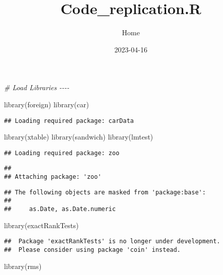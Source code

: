 \documentclass[
]{article}
\title{Code\_replication.R}
\author{Home}
\date{2023-04-16}
\newenvironment{Shaded}{\begin{snugshade}}{\end{snugshade}}
\newcommand{\CommentTok}[1]{\textcolor[rgb]{0.56,0.35,0.01}{\textit{#1}}}
\newcommand{\FunctionTok}[1]{\textcolor[rgb]{0.00,0.00,0.00}{#1}}
\newcommand{\NormalTok}[1]{#1}
\begin{document}
\maketitle

\begin{Shaded}
\begin{Highlighting}[]
\CommentTok{\# Load Libraries {-}{-}{-}{-}}

\FunctionTok{library}\NormalTok{(foreign)}
\FunctionTok{library}\NormalTok{(car)}
\end{Highlighting}
\end{Shaded}

\begin{verbatim}
## Loading required package: carData
\end{verbatim}

\begin{Shaded}
\begin{Highlighting}[]
\FunctionTok{library}\NormalTok{(xtable)}
\FunctionTok{library}\NormalTok{(sandwich)}
\FunctionTok{library}\NormalTok{(lmtest)}
\end{Highlighting}
\end{Shaded}

\begin{verbatim}
## Loading required package: zoo
\end{verbatim}

\begin{verbatim}
## 
## Attaching package: 'zoo'
\end{verbatim}

\begin{verbatim}
## The following objects are masked from 'package:base':
## 
##     as.Date, as.Date.numeric
\end{verbatim}

\begin{Shaded}
\begin{Highlighting}[]
\FunctionTok{library}\NormalTok{(exactRankTests)}
\end{Highlighting}
\end{Shaded}

\begin{verbatim}
##  Package 'exactRankTests' is no longer under development.
##  Please consider using package 'coin' instead.
\end{verbatim}

\begin{Shaded}
\begin{Highlighting}[]
\FunctionTok{library}\NormalTok{(rms)}
\end{Highlighting}
\end{Shaded}
\end{document}
